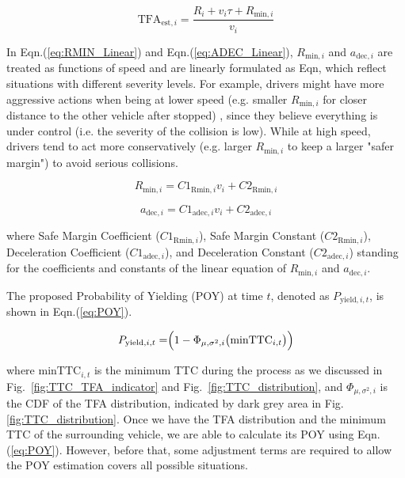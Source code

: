 \begin{equation}
\text{TFA}_{\mathrm{est},i} = \frac{R_i+v_i\tau+R_{\mathrm{min},i}}{v_i} 
\label{eq:TFA_est}
\end{equation}

In Eqn.(\ref{eq:RMIN_Linear}) and Eqn.(\ref{eq:ADEC_Linear}), $R_{\mathrm{min},i}$ and $a_{\mathrm{dec},i}$ are treated as functions of speed and are linearly formulated as Eqn, which reflect situations with different severity levels. For example, drivers might have more aggressive actions when being at lower speed (e.g. smaller $R_{\mathrm{min},i}$ for closer distance to the other vehicle after stopped) , since they believe everything is under control (i.e. the severity of the collision is low). While at high speed, drivers tend to act more conservatively (e.g. larger $R_{\mathrm{min},i}$ to keep a larger "safer margin") to avoid serious collisions. 
 
\begin{equation}
R_{\mathrm{min},i} = {C1}_{\mathrm{Rmin},i} v_i + {C2}_{\mathrm{Rmin},i}
\label{eq:RMIN_Linear}
\end{equation}

\begin{equation}
a_{\mathrm{dec},i} = {C1}_{\mathrm{adec},i} v_i + {C2}_{\mathrm{adec},i}
\label{eq:ADEC_Linear}
\end{equation}

\noindent where Safe Margin Coefficient (${C1}_{\mathrm{Rmin},i}$), Safe Margin Constant (${C2}_{\mathrm{Rmin},i}$), Deceleration Coefficient (${C1}_{\mathrm{adec},i}$), and Deceleration Constant (${C2}_{\mathrm{adec},i}$) standing for the coefficients and constants of the linear equation of $R_{\mathrm{min},i}$ and $a_{\mathrm{dec},i}$.

The proposed Probability of Yielding (POY) at time $t$, denoted as $P_{\mathrm{yield}, i,t}$, is shown in Eqn.(\ref{eq:POY}).  

\begin{equation}
    P_{\mathrm{yield}, i,t} = \Bigr(1-\Phi_{\mu, \sigma^{2},i}\big({\mathrm{min TTC}}_{i,t}\big)\Bigl)
\label{eq:POY}
\end{equation}

\noindent  where ${\mathrm{minTTC}}_{i,t}$ is the minimum TTC during the process as we discussed in Fig.~\ref{fig:TTC_TFA_indicator} and Fig.~\ref{fig:TTC_distribution}, and $\Phi_{\mu, \sigma^{2},i}$ is the CDF of the TFA distribution, indicated by dark grey area in Fig. \ref{fig:TTC_distribution}. Once we have the TFA distribution and the minimum TTC of the surrounding vehicle, we are able to calculate its POY using Eqn.(\ref{eq:POY}). However, before that, some adjustment terms are required to allow the POY estimation covers all possible situations.

